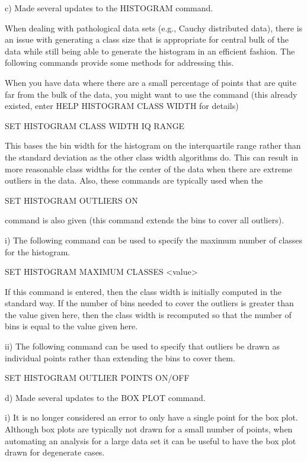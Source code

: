     c) Made several updates to the HISTOGRAM command.

       When dealing with pathological data sets (e.g., Cauchy distributed
       data), there is an issue with generating a class size that is
       appropriate for central bulk of the data while still being able
       to generate the histogram in an efficient fashion.  The following
       commands provide some methods for addressing this.

       When you have data where there are a small percentage of points
       that are quite far from the bulk of the data, you might want to
       use the command (this already existed, enter HELP HISTOGRAM CLASS
       WIDTH for details)

            SET HISTOGRAM CLASS WIDTH IQ RANGE

       This bases the bin width for the histogram on the interquartile
       range rather than the standard deviation as the other class width
       algorithms do.  This can result in more reasonable class widths
       for the center of the data when there are extreme outliers in the
       data.  Also, these commands are typically used when the

            SET HISTOGRAM OUTLIERS ON

       command is also given (this command extends the bins to cover all
       outliers).

         i) The following command can be used to specify the maximum
            number of classes for the histogram.

                SET HISTOGRAM MAXIMUM CLASSES <value>

            If this command is entered, then the class width is initially
            computed in the standard way.  If the number of bins needed to
            cover the outliers is greater than the value given here, then
            the class width is recomputed so that the number of bins is
            equal to the value given here.

        ii) The following command can be used to specify that outliers
            be drawn as individual points rather than extending the bins
            to cover them.

               SET HISTOGRAM OUTLIER POINTS ON/OFF

    d) Made several updates to the BOX PLOT command.

          i) It is no longer considered an error to only have a single
             point for the box plot.  Although box plots are typically
             not drawn for a small number of points, when automating an
             analysis for a large data set it can be useful to have the
             box plot drawn for degenerate cases.

